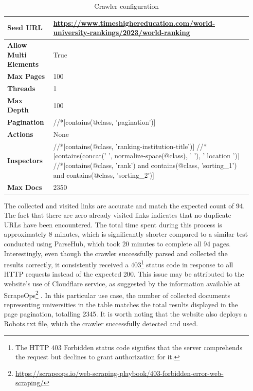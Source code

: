 {\begin{table}[ht] 
{\footnotesize
\begin{tabular}{ P{3cm} ||P{10.1cm}  }      %
 \hline \hline
\textbf{Seed URL} & \href{https://www.timeshighereducation.com/world-university-rankings/2023/world-ranking}{https://www.timeshighereducation.com/world-university-rankings/2023/world-ranking}\T\B 
\\ 
\hline
\textbf{Allow Multi Elements} & True \T\B 
\\ 
\hline
\textbf{Max Pages} & 100\T\B 
\\ 
\hline
\textbf{Threads} & 1\T\B 
\\ 
\hline
\textbf{Max Depth} & 100\T\B 
\\ 
\hline
\textbf{Pagination} & //*[contains(@class, 'pagination')]\T\B 
\\ 
\hline
\textbf{Actions} & None\T\B 
\\ 
\hline
\textbf{Inspectors} & //*[contains(@class, 'ranking-institution-title')] \newline //*[contains(concat(' ', normalize-space(@class), ' '), ' location ')] \newline //*[contains(@class, 'rank') and contains(@class, 'sorting\_1') and contains(@class, 'sorting\_2')]
\T\B 
\\ 
\hline
\textbf{Max Docs} & 2350\T\B 
\\ 
\hline \hline
    \end{tabular}
}
  \captionsetup{justification=centering,margin=2cm}
  \caption{Crawler configuration}
  \label{table:crawler_conf_uni}
\end{table}

The collected and visited links are accurate and match the expected count of 94. The fact that there are zero already visited links indicates that no duplicate URLs have been encountered. The total time spent during this process is approximately 8 minutes, which is significantly shorter compared to a similar test conducted using ParseHub, which took 20 minutes to complete all 94 pages.
Interestingly, even though the crawler successfully parsed and collected the results correctly, it consistently received a 403\footnote{The HTTP 403 Forbidden status code signifies that the server comprehends the request but declines to grant authorization for it.} status code in response to all HTTP requests instead of the expected 200. This issue may be attributed to the website's use of Cloudflare service, as suggested by the information available at ScrapeOps\footnote{\url{https://scrapeops.io/web-scraping-playbook/403-forbidden-error-web-scraping/}} .
In this particular use case, the number of collected documents representing universities in the table matches the total results displayed in the page pagination, totalling 2345. It is worth noting that the website also deploys a Robots.txt file, which the crawler successfully detected and used.

}
